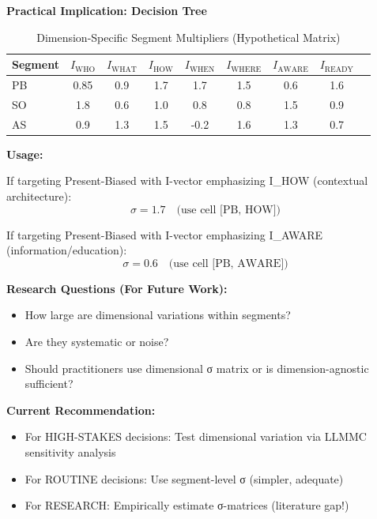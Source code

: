 \textbf{Practical Implication: Decision Tree}

\begin{table}[htbp]
\centering
\caption{Dimension-Specific Segment Multipliers (Hypothetical Matrix)}
\label{tab:19-sigma-by-dimension}
\renewcommand{\arraystretch}{1.3}
\footnotesize
\begin{tabular}{@{}lcccccccc@{}}
\toprule
\textbf{Segment} & $I_{\text{WHO}}$ & $I_{\text{WHAT}}$ & $I_{\text{HOW}}$ & $I_{\text{WHEN}}$ & $I_{\text{WHERE}}$ & $I_{\text{AWARE}}$ & $I_{\text{READY}}$ \\
\midrule
PB & 0.85 & 0.9 & 1.7 & 1.7 & 1.5 & 0.6 & 1.6 \\
SO & 1.8 & 0.6 & 1.0 & 0.8 & 0.8 & 1.5 & 0.9 \\
AS & 0.9 & 1.3 & 1.5 & -0.2 & 1.6 & 1.3 & 0.7 \\
\bottomrule
\end{tabular}
\end{table}

\textbf{Usage:}

If targeting Present-Biased with I-vector emphasizing I_HOW (contextual architecture):
\begin{equation}
\sigma = 1.7 \quad \text{(use cell [PB, HOW])}
\end{equation}

If targeting Present-Biased with I-vector emphasizing I_AWARE (information/education):
\begin{equation}
\sigma = 0.6 \quad \text{(use cell [PB, AWARE])}
\end{equation}

\textbf{Research Questions (For Future Work):}
\begin{itemize}[nosep]
\item How large are dimensional variations within segments?
\item Are they systematic or noise?
\item Should practitioners use dimensional σ matrix or is dimension-agnostic sufficient?
\end{itemize}

\textbf{Current Recommendation:}
\begin{itemize}[nosep]
\item For HIGH-STAKES decisions: Test dimensional variation via LLMMC sensitivity analysis
\item For ROUTINE decisions: Use segment-level σ (simpler, adequate)
\item For RESEARCH: Empirically estimate σ-matrices (literature gap!)
\end{itemize}

